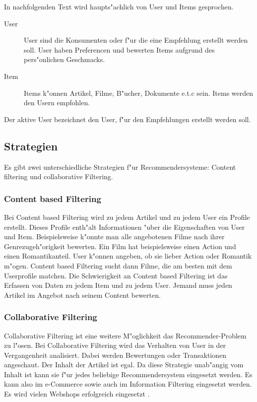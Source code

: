 \documentclass[a4paper, 12pt]{article}
\begin{document}
In nachfolgenden Text wird haupts"achlich von User und Items gesprochen. 

\begin{description}
\item[User] User sind die Konsumenten oder f"ur die eine Empfehlung erstellt werden soll. 
User haben Preferencen und bewerten Items aufgrund des pers"onlichen Geschmacks. 
\item[Item] 
Items k"onnen Artikel, Filme, B"ucher, Dokumente e.t.c sein. Items werden den Usern empfohlen.
\end{description}

Der aktive User bezeichnet den User, f"ur den Empfehlungen erstellt werden soll.

\subsection{Strategien}
\label{sec:strategies}

Es gibt zwei unterschiedliche Strategien f"ur Recommendersysteme: Content filtering und collaborative Filtering. 

\subsubsection{Content based Filtering}
\label{sec:contentbased}

Bei Content based Filtering wird zu jedem Artikel und zu jedem User ein Profile erstellt. Dieses Profile enth"alt Informationen "uber die Eigenschaften von User und Item. Beispielsweise k"onnte man alle angebotenen Filme nach ihrer Genrezugeh"origkeit bewerten. Ein Film hat beispielsweise einen Action und einen Romantikanteil. User k"onnen angeben, ob sie lieber Action oder Romantik m"ogen. Content based Filtering sucht dann Filme, die am besten mit dem Userprofile matchen. Die Schwierigkeit an Content based Filtering ist das Erfassen von Daten zu jedem Item und zu jedem User. Jemand muss jeden Artikel im Angebot nach seinem Content bewerten.

\subsubsection{Collaborative Filtering}
\label{sec:collaborativefiltering}

Collaborative Filtering ist eine weitere M"oglichkeit das Re\-commender-Prob\-lem zu l"osen. Bei Collaborative Filtering wird das Verhalten von User in der Vergangenheit analisiert. Dabei werden Bewertungen oder Transaktionen angeschaut. Der Inhalt der Artikel ist egal. Da diese Strategie unab"angig vom Inhalt ist kann sie f"ur jedes beliebige Recommendersystem eingesetzt werden. Es kann also im e-Commerce sowie auch im Information Filtering eingesetzt werden.  Es wird vielen Webshops erfolgreich eingesetzt \cite{sarwar01}. 
\end{document}
